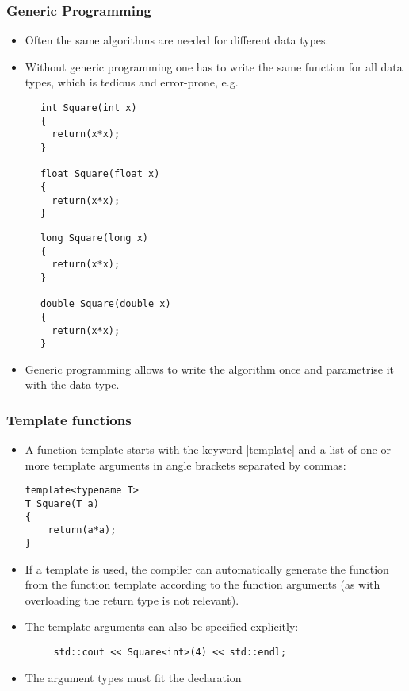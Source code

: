 
\begin{frame}[fragile]
\frametitle<presentation>{Generic Programming}


\begin{itemize}%
\item Often the same algorithms are needed for different data types.
\item Without generic programming one has to write the same function for all data types, which is tedious and error-prone, e.g.
\end{itemize}
\vspace*{-10mm}
\begin{multicols}{2}
    \begin{lstlisting}
      int Square(int x)
      {
        return(x*x);
      }

      float Square(float x)
      {
        return(x*x);
      }
    \end{lstlisting}

    \begin{lstlisting}
      long Square(long x)
      {
        return(x*x);
      }

      double Square(double x)
      {
        return(x*x);
      }      
    \end{lstlisting}
\end{multicols}
\vskip-7mm
\begin{itemize}
\item Generic programming allows to write the algorithm once and parametrise it with the
data type.
\end{itemize}

\end{frame}


\begin{frame}[fragile]
\frametitle{Template functions}
\begin{itemize}%
\item A function template starts with the keyword \inline|template| and a list of one or more template arguments
in angle brackets separated by commas:
\begin{lstlisting}
template<typename T>
T Square(T a)
{
    return(a*a);
}
\end{lstlisting}
\item If a template is used, the compiler can automatically generate the function from the function template according to the function arguments (as with overloading the return type is not relevant).
 \item The template arguments can also be specified explicitly:
 \begin{lstlisting}
     std::cout << Square<int>(4) << std::endl;
 \end{lstlisting}
 \item The argument types must fit the declaration
\end{itemize}
\end{frame}

